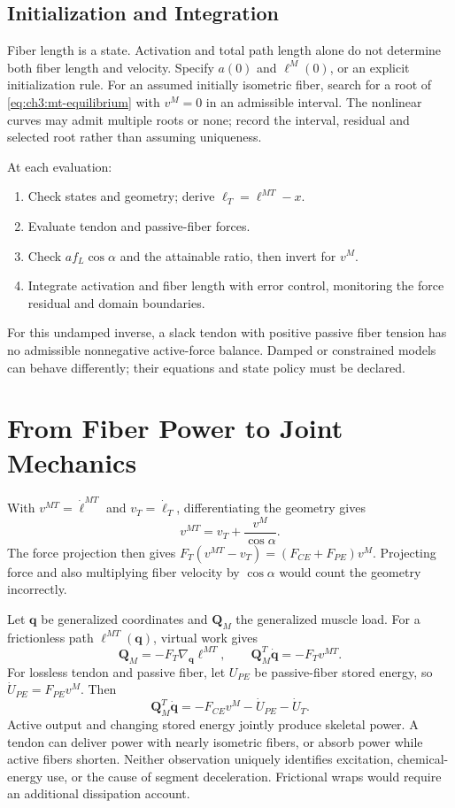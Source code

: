 \subsection{Initialization and Integration}

Fiber length is a state. Activation and total path length alone do not determine
both fiber length and velocity. Specify $a(0)$ and $\ell^M(0)$, or an explicit
initialization rule. For an assumed initially isometric fiber, search for a root
of \eqref{eq:ch3:mt-equilibrium} with $v^M=0$ in an admissible interval.
The nonlinear curves may admit multiple roots or none; record the interval,
residual and selected root rather than assuming uniqueness.

At each evaluation:
\begin{enumerate}
 \item Check states and geometry; derive $\ell_T=\ell^{MT}-x$.
 \item Evaluate tendon and passive-fiber forces.
 \item Check $a f_L\cos\alpha$ and the attainable ratio, then invert for $v^M$.
 \item Integrate activation and fiber length with error control, monitoring
 the force residual and domain boundaries.
\end{enumerate}
For this undamped inverse, a slack tendon with positive passive fiber tension
has no admissible nonnegative active-force balance. Damped or constrained
models can behave differently; their equations and state policy must be declared.

\section{From Fiber Power to Joint Mechanics}

With $v^{MT}=\dot\ell^{MT}$ and $v_T=\dot\ell_T$,
differentiating the geometry gives
\[
 v^{MT}=v_T+\frac{v^M}{\cos\alpha}.
\]
The force projection then gives
$F_T(v^{MT}-v_T)=(F_{CE}+F_{PE})v^M$.
Projecting force and also multiplying fiber velocity by $\cos\alpha$
would count the geometry incorrectly.

Let $\bm q$ be generalized coordinates and $\bm Q_M$ the generalized muscle
load. For a frictionless path $\ell^{MT}(\bm q)$, virtual work gives
\[
 \bm Q_M=-F_T\nabla_{\bm q}\ell^{MT},\qquad
 \bm Q_M^T\dot{\bm q}=-F_Tv^{MT}.
\]
For lossless tendon and passive fiber, let $U_{PE}$ be passive-fiber stored
energy, so $\dot U_{PE}=F_{PE}v^M$. Then
\begin{equation}
 \bm Q_M^T\dot{\bm q}
 =-F_{CE}v^M-\dot U_{PE}-\dot U_T.
 \label{eq:ch3:power-balance}
\end{equation}
Active output and changing stored energy jointly produce skeletal power.
A tendon can deliver power with nearly isometric fibers, or absorb power
while active fibers shorten. Neither observation uniquely identifies excitation,
chemical-energy use, or the cause of segment deceleration.
Frictional wraps would require an additional dissipation account.

